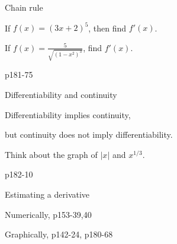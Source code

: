 \begin{frame}{Chain rule}

\begin{example}
If $f\left(x\right)=\left(3x+2\right)^{5}$, then find $f'\left(x\right)$.
\end{example}



\begin{example}
If $f\left(x\right)=\frac{5}{\sqrt{\left(1-x^{2}\right)^{3}}}$, find
$f'\left(x\right)$.
\end{example}



\begin{example}
p181-75
\end{example}

\end{frame}

\begin{frame}{Differentiability and continuity}


Differentiability implies continuity,


but continuity does not imply differentiability.


Think about the graph of $\left|x\right|$ and $x^{1/3}$.


\pause{}
\begin{example}
p182-10
\end{example}

\end{frame}

\begin{frame}{Estimating a derivative}

\begin{example}
Numerically, p153-39,40
\end{example}


\pause{}
\begin{example}
Graphically, p142-24, p180-68
\end{example}

\end{frame}

